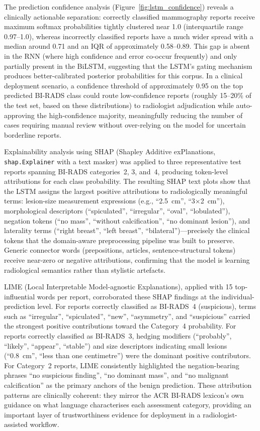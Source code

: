 \documentclass[11pt,a4paper]{article}
\begin{document}
The prediction confidence analysis (Figure~\ref{fig:lstm_confidence})
reveals a clinically actionable separation: correctly classified mammography
reports receive maximum softmax probabilities tightly clustered near 1.0
(interquartile range 0.97--1.0), whereas incorrectly classified reports have
a much wider spread with a median around 0.71 and an IQR of approximately
0.58--0.89.
This gap is absent in the RNN (where high confidence and error co-occur
frequently) and only partially present in the BiLSTM, suggesting that the
LSTM's gating mechanism produces better-calibrated posterior probabilities
for this corpus.
In a clinical deployment scenario, a confidence threshold of approximately
0.95 on the top predicted BI-RADS class could route low-confidence reports
(roughly 15--20\% of the test set, based on these distributions) to radiologist
adjudication while auto-approving the high-confidence majority, meaningfully
reducing the number of cases requiring manual review without over-relying on
the model for uncertain borderline reports.

Explainability analysis using SHAP (Shapley Additive exPlanations,
\texttt{shap.Explainer} with a text masker) was applied to three representative
test reports spanning BI-RADS categories~2, 3, and~4, producing token-level
attributions for each class probability.
The resulting SHAP text plots show that the LSTM assigns the largest positive
attributions to radiologically meaningful terms: lesion-size measurement
expressions (e.g., ``2.5~cm'', ``3$\times$2~cm''), morphological descriptors
(``spiculated'', ``irregular'', ``oval'', ``lobulated''), negation tokens
(``no mass'', ``without calcification'', ``no dominant lesion''), and
laterality terms (``right breast'', ``left breast'', ``bilateral'')---precisely
the clinical tokens that the domain-aware preprocessing pipeline was built to
preserve.
Generic connector words (prepositions, articles, sentence-structural tokens)
receive near-zero or negative attributions, confirming that the model is
learning radiological semantics rather than stylistic artefacts.

LIME (Local Interpretable Model-agnostic Explanations), applied with 15
top-influential words per report, corroborated these SHAP findings at the
individual-prediction level.
For reports correctly classified as BI-RADS~4 (suspicious), terms such as
``irregular'', ``spiculated'', ``new'', ``asymmetry'', and ``suspicious''
carried the strongest positive contributions toward the Category~4 probability.
For reports correctly classified as BI-RADS~3, hedging modifiers
(``probably'', ``likely'', ``appear'', ``stable'') and size descriptors
indicating small lesions (``0.8~cm'', ``less than one centimetre'')
were the dominant positive contributors.
For Category~2 reports, LIME consistently highlighted the negation-bearing
phrases ``no suspicious finding'', ``no dominant mass'', and ``no malignant
calcification'' as the primary anchors of the benign prediction.
These attribution patterns are clinically coherent: they mirror the ACR
BI-RADS lexicon's own guidance on what language characterises each assessment
category, providing an important layer of trustworthiness evidence for
deployment in a radiologist-assisted workflow.
\end{document}
